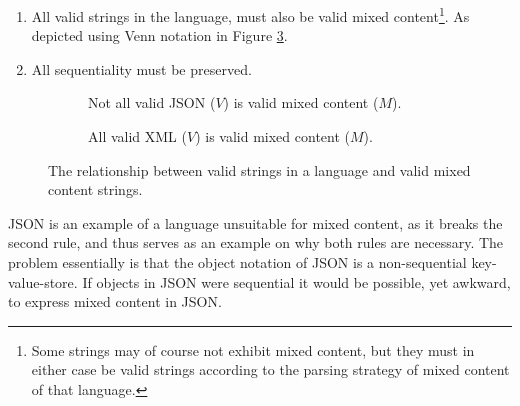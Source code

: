 \documentclass{scrreprt}
\begin{document}
\begin{enumerate}
\item All valid strings in the language, must also be valid mixed content\footnote{Some strings may of course not exhibit mixed content, but they must in either case be valid strings according to the parsing strategy of mixed content of that language.}. As depicted using Venn notation in Figure \ref{fig:mixed-content-venn}.
\item All sequentiality must be preserved.
\end{enumerate}


\begin{figure}[h]
\centering
\begin{subfigure}{.4\textwidth}
  \centering

  \caption{Not all valid JSON ($V$) is valid mixed content ($M$).}
  \label{fig:mixed-content-venn-json}
  
\end{subfigure}%
\begin{subfigure}{.4\textwidth}
  \centering

  \caption{All valid XML ($V$) is valid mixed content ($M$).}
  \label{fig:mixed-content-venn-json}
  
\end{subfigure}
\caption{The relationship between valid strings in a language and valid mixed content strings.}
\label{fig:mixed-content-venn}
\end{figure}



JSON is an example of a language unsuitable for mixed content, as it breaks the second rule, and thus serves as an example on why both rules are necessary. The problem essentially is that the object notation of JSON is a non-sequential key-value-store. If objects in JSON were sequential it would be possible, yet awkward, to express mixed content in JSON.
\end{document}
